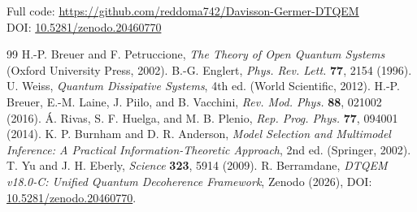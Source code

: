 \documentclass[reprint,amsmath,amssymb,aps,pra,superscriptaddress]{revtex4-2}
\begin{document}
Full code: \url{https://github.com/reddoma742/Davisson-Germer-DTQEM} \\
DOI: \href{https://doi.org/10.5281/zenodo.20460770}{10.5281/zenodo.20460770}

\begin{thebibliography}{99}
 H.-P. Breuer and F. Petruccione, \emph{The Theory of Open Quantum Systems} (Oxford University Press, 2002).
 B.-G. Englert, \emph{Phys. Rev. Lett.} \textbf{77}, 2154 (1996).
 U. Weiss, \emph{Quantum Dissipative Systems}, 4th ed. (World Scientific, 2012).
 H.-P. Breuer, E.-M. Laine, J. Piilo, and B. Vacchini, \emph{Rev. Mod. Phys.} \textbf{88}, 021002 (2016).
 \'{A}. Rivas, S. F. Huelga, and M. B. Plenio, \emph{Rep. Prog. Phys.} \textbf{77}, 094001 (2014).
 K. P. Burnham and D. R. Anderson, \emph{Model Selection and Multimodel Inference: A Practical Information-Theoretic Approach}, 2nd ed. (Springer, 2002).
 T. Yu and J. H. Eberly, \emph{Science} \textbf{323}, 5914 (2009).
 R. Berramdane, \emph{DTQEM v18.0-C: Unified Quantum Decoherence Framework}, Zenodo (2026), DOI: \href{https://doi.org/10.5281/zenodo.20460770}{10.5281/zenodo.20460770}.
\end{thebibliography}
\end{document}
